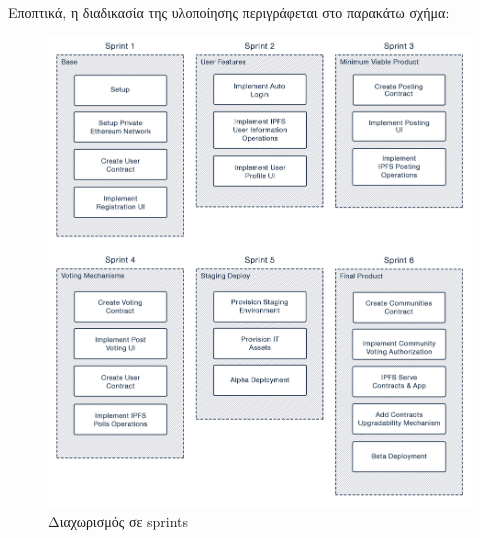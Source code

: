 Εποπτικά, η διαδικασία της υλοποίησης περιγράφεται στο παρακάτω σχήμα:

\begin{figure}[H]
    \centering
    \includegraphics[width=.9\textwidth]{assets/figures/chapter-3/3.8.implementation-methodology-specification-sprints.png}
    \caption{Διαχωρισμός σε sprints}
    \label{figure:3.8.implementation-methodology-specification-sprints}
\end{figure}
